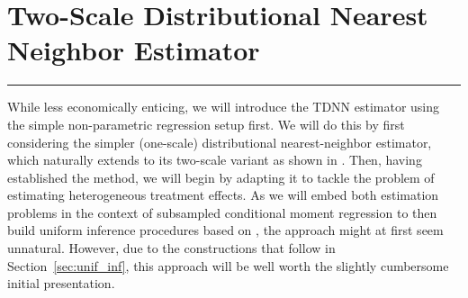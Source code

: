 \section{Two-Scale Distributional Nearest Neighbor Estimator}\label{sec:TDNN}
\hrule
While less economically enticing, we will introduce the TDNN estimator using the simple non-parametric regression setup first.
We will do this by first considering the simpler (one-scale) distributional nearest-neighbor estimator, which naturally extends to its two-scale variant as shown in \citet{demirkaya_optimal_2024}.
Then, having established the method, we will begin by adapting it to tackle the problem of estimating heterogeneous treatment effects.
As we will embed both estimation problems in the context of subsampled conditional moment regression to then build uniform inference procedures based on \citet{ritzwoller_simultaneous_2024}, the approach might at first seem unnatural.
However, due to the constructions that follow in Section~\ref{sec:unif_inf}, this approach will be well worth the slightly cumbersome initial presentation.

